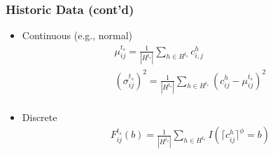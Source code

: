 \documentclass[t]{beamer}
\begin{document}
\begin{frame}\frametitle{Historic Data \small{(cont'd)}}
\begin{itemize}
\item Continuous (e.g., normal)
\begin{gather*}
	\mu_{ij}^{t_s} = \frac{1}{|H^{t_s}|}\sum_{h\in H^{t_s}} c_{i,j}^h\\ 
	(\sigma_{ij}^{t_s})^2 = \frac{1}{|H^{t_s}|}\sum_{h\in H^{t_s}} (c_{ij}^h-\mu_{ij}^{t_s})^2\\
\end{gather*}
\item Discrete
\begin{gather*}
  F_{ij}^{t_s}(b) = \frac{1}{|H^{t_s}|}\sum_{h\in H^{t_s}} I(\lceil c_{ij}^h \rceil^\phi= b)
\end{gather*}
\end{itemize}
\end{frame}
\end{document}
